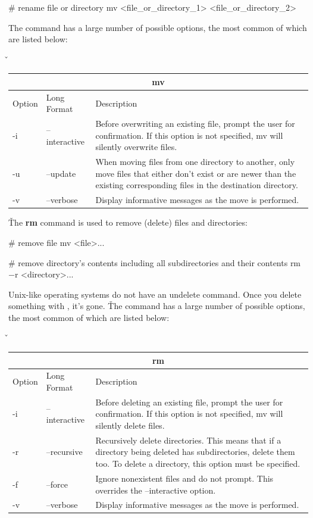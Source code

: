 \begin{bash}
# rename file or directory
mv <file_or_directory_1> <file_or_directory_2>
\end{bash}

The  command has a large number of possible options, the most common of which are listed below:

\v

\begin{tabular}{ |p{1cm}|p{3cm}||p{10.6cm}| }
\hline
\multicolumn{3}{|c|}{mv} \\
\hline
Option& Long Format& Description\\
\hline
-i & --interactive & Before overwriting an existing file, prompt the user for confirmation. If this option is not
specified, mv will silently overwrite files.\\
-u & --update & When moving files from one directory to another, only move files that either don't exist or are newer
than the existing corresponding files in the destination directory.\\
-v & --verbose & Display informative messages as the move is performed.\\
\hline
\end{tabular}

\v

The \textbf{rm} command is used to remove (delete) files and directories:
\begin{bash}
# remove file
mv <file>...
\end{bash}

\begin{bash}
# remove directory's contents including all subdirectories and their contents
rm $-$r <directory>...
\end{bash}

Unix-like operating systems do not have an undelete command. Once you delete something with , it's gone. \v

The  command has a large number of possible options, the most common of which are listed below:

\v

\begin{tabular}{ |p{1cm}|p{3cm}||p{10.6cm}| }
\hline
\multicolumn{3}{|c|}{rm} \\
\hline
Option& Long Format& Description\\
\hline
-i & --interactive & Before deleting an existing file, prompt the user for confirmation. If this option is not
specified, mv will silently delete files.\\
-r & --recursive & Recursively delete directories. This means that if a directory being deleted has subdirectories,
delete them too. To delete a directory, this option must be specified.\\
-f & --force & Ignore nonexistent files and do not prompt. This overrides the --interactive option.\\
-v & --verbose & Display informative messages as the move is performed.\\
\hline
\end{tabular}

